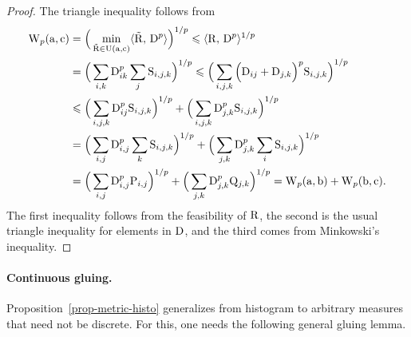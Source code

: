\begin{proof}
The triangle inequality follows from
$$\begin{aligned}
\operatorname{\mathrm{W}}_p(\mathrm{a},\mathrm{c})&=\Big(\min_{\tilde{\mathrm{R}}\in \mathrm{U}(\mathrm{a},\mathrm{c})}\langle \tilde{\mathrm{R}},\,\mathrm{D}^p\rangle\Big)^{1/p} \leqslant \langle \mathrm{R},\,\mathrm{D}^p\rangle^{1/p}\\
&= \Big(\sum_{i,k}  \mathrm{D}^p_{ik}\sum_{j} \mathrm{S}_{i,j,k} \Big)^{1/p}
 \leqslant \Big(\sum_{i,j,k} \left(\mathrm{D}_{ij}+\mathrm{D}_{j,k}\Big)^p  \mathrm{S}_{i,j,k} \right)^{1/p} \\
& \leqslant \Big(\sum_{i,j,k} \mathrm{D}^p_{ij} \mathrm{S}_{i,j,k} \Big)^{1/p} + \Big(\sum_{i,j,k}\mathrm{D}^p_{j,k} \mathrm{S}_{i,j,k} \Big)^{1/p} \\
&= \Big(\sum_{i,j} \mathrm{D}^p_{i,j}  \sum_k \mathrm{S}_{i,j,k} \Big)^{1/p} + \Big(\sum_{j,k} \mathrm{D}^p_{j,k}  \sum_i \mathrm{S}_{i,j,k} \Big)^{1/p}\\
&= \Big(\sum_{i,j} \mathrm{D}^p_{i,j}\mathrm{P}_{i,j}\Big)^{1/p} + \Big(\sum_{j,k} \mathrm{D}^p_{j,k} \mathrm{Q}_{j,k}\Big)^{1/p}
= \operatorname{\mathrm{W}}_p(\mathrm{a},\mathrm{b}) +\operatorname{\mathrm{W}}_p(\mathrm{b},\mathrm{c}).
\end{aligned}
$$
%
The first inequality follows from the feasibility of $\mathrm{R}$, the second is the usual triangle inequality for elements in $\mathrm{D}$, and the third comes from Minkowski's inequality.
\end{proof}

\paragraph{Continuous gluing.}

Proposition~\ref{prop-metric-histo} generalizes from histogram to arbitrary measures that need not be discrete. For this, one needs the following general gluing lemma.

